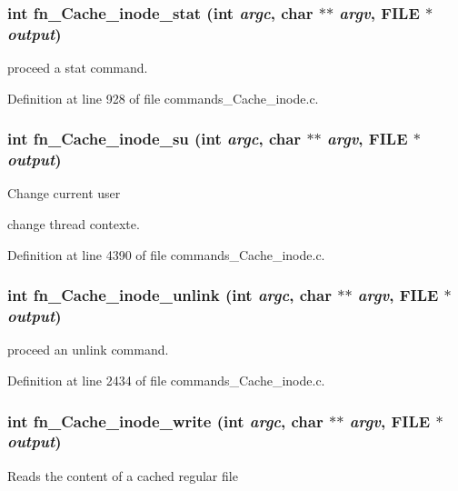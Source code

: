 \subsubsection[{fn\_\-Cache\_\-inode\_\-stat}]{\setlength{\rightskip}{0pt plus 5cm}int fn\_\-Cache\_\-inode\_\-stat (int {\em argc}, \/  char $\ast$$\ast$ {\em argv}, \/  FILE $\ast$ {\em output})}\label{commands_8h_a4cd5ca6eb69f06e858fc1ff59837dcce}
proceed a stat command. 

Definition at line 928 of file commands\_\-Cache\_\-inode.c.
\subsubsection[{fn\_\-Cache\_\-inode\_\-su}]{\setlength{\rightskip}{0pt plus 5cm}int fn\_\-Cache\_\-inode\_\-su (int {\em argc}, \/  char $\ast$$\ast$ {\em argv}, \/  FILE $\ast$ {\em output})}\label{commands_8h_ae03b408b9dc4ff37949b4b761be07a08}
Change current user

change thread contexte. 

Definition at line 4390 of file commands\_\-Cache\_\-inode.c.
\subsubsection[{fn\_\-Cache\_\-inode\_\-unlink}]{\setlength{\rightskip}{0pt plus 5cm}int fn\_\-Cache\_\-inode\_\-unlink (int {\em argc}, \/  char $\ast$$\ast$ {\em argv}, \/  FILE $\ast$ {\em output})}\label{commands_8h_a678890f8119b2f025a9ebea4166785a9}
proceed an unlink command. 

Definition at line 2434 of file commands\_\-Cache\_\-inode.c.
\subsubsection[{fn\_\-Cache\_\-inode\_\-write}]{\setlength{\rightskip}{0pt plus 5cm}int fn\_\-Cache\_\-inode\_\-write (int {\em argc}, \/  char $\ast$$\ast$ {\em argv}, \/  FILE $\ast$ {\em output})}\label{commands_8h_a5a76c77b008b02d4ffaafe5e6c23767a}
Reads the content of a cached regular file 

